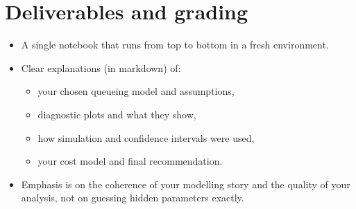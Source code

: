 \documentclass[a4paper,11pt]{article}
\begin{document}
\section*{Deliverables and grading}

\begin{itemize}
  \item A single notebook that runs from top to bottom in a fresh environment.
  \item Clear explanations (in markdown) of:
    \begin{itemize}
      \item your chosen queueing model and assumptions,
      \item diagnostic plots and what they show,
      \item how simulation and confidence intervals were used,
      \item your cost model and final recommendation.
    \end{itemize}
  \item Emphasis is on the coherence of your modelling story and the quality of your analysis, not on guessing hidden parameters exactly.
\end{itemize}
\end{document}
